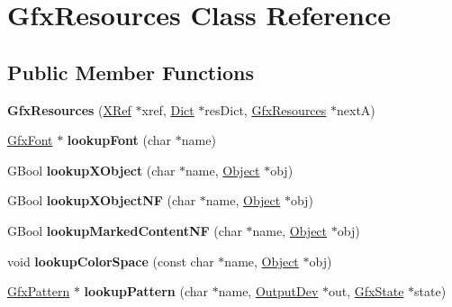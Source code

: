 \hypertarget{class_gfx_resources}{}\section{Gfx\+Resources Class Reference}
\label{class_gfx_resources}
\subsection*{Public Member Functions}
\begin{DoxyCompactItemize}
\item 
\mbox{\label{class_gfx_resources_acf044911dd7bb7aa7046f486b28076ce}} 
{\bfseries Gfx\+Resources} (\hyperlink{class_x_ref}{X\+Ref} $\ast$xref, \hyperlink{class_dict}{Dict} $\ast$res\+Dict, \hyperlink{class_gfx_resources}{Gfx\+Resources} $\ast$nextA)
\item 
\mbox{\label{class_gfx_resources_a3b7965df897ad4b69ddb1bc820652eb5}} 
\hyperlink{class_gfx_font}{Gfx\+Font} $\ast$ {\bfseries lookup\+Font} (char $\ast$name)
\item 
\mbox{\label{class_gfx_resources_a092a22a60f6a664183ffdad34fefaefb}} 
G\+Bool {\bfseries lookup\+X\+Object} (char $\ast$name, \hyperlink{class_object}{Object} $\ast$obj)
\item 
\mbox{\label{class_gfx_resources_a62cacd9f6bd4974436eaca26cd4bc702}} 
G\+Bool {\bfseries lookup\+X\+Object\+NF} (char $\ast$name, \hyperlink{class_object}{Object} $\ast$obj)
\item 
\mbox{\label{class_gfx_resources_a2ccda87347978bf26639ac9b79d12c60}} 
G\+Bool {\bfseries lookup\+Marked\+Content\+NF} (char $\ast$name, \hyperlink{class_object}{Object} $\ast$obj)
\item 
\mbox{\label{class_gfx_resources_ab98ee010e856a4f021d5a9cdd752b4d7}} 
void {\bfseries lookup\+Color\+Space} (const char $\ast$name, \hyperlink{class_object}{Object} $\ast$obj)
\item 
\mbox{\label{class_gfx_resources_ab8bfa3bc73e5909c7febe4ed63125f0e}} 
\hyperlink{class_gfx_pattern}{Gfx\+Pattern} $\ast$ {\bfseries lookup\+Pattern} (char $\ast$name, \hyperlink{class_output_dev}{Output\+Dev} $\ast$out, \hyperlink{class_gfx_state}{Gfx\+State} $\ast$state)

\end{DoxyCompactItemize}
